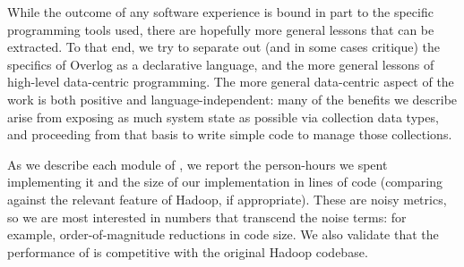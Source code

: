While the outcome of any software experience is bound in part to the specific
programming tools used, there are hopefully more general lessons that can be
extracted.  To that end, we try to separate out (and in some cases critique) the
specifics of Overlog as a declarative language, and the more general lessons of high-level data-centric
programming.  
The more
general data-centric aspect of the work is both positive and language-independent: many of the benefits
we describe arise from exposing as much system state as possible via collection
data types, and proceeding from that basis to write simple code to manage those
collections.%


As we describe each module of \BOOMA, we report the person-hours we spent
implementing it and the size of our implementation in lines of code (comparing
against the relevant feature of Hadoop, if appropriate). These are noisy
metrics, so we are most interested in numbers that transcend the noise terms:
for example, order-of-magnitude reductions in code size.  We also validate that
the performance of \BOOMA is competitive with the original Hadoop codebase.






% 

